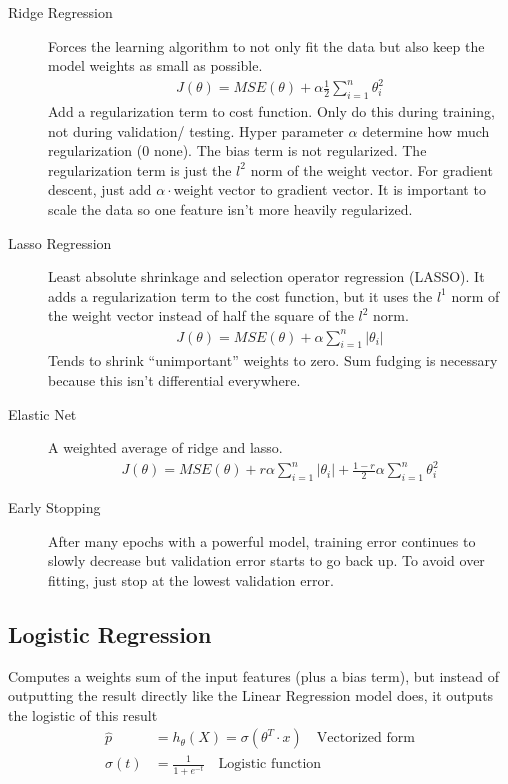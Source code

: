 \documentclass[10pt]{article}
\begin{document}
  \begin{description}
    \item[Ridge Regression] Forces the learning algorithm to not only fit the
      data but also keep the model weights as small as possible.
      \begin{align}
        J(\theta)=MSE(\theta)+\alpha\frac{1}{2}\sum_{i=1}^{n}\theta_i^2
      \end{align}
      Add a regularization term to cost function. Only do this during training,
      not during validation/ testing. Hyper parameter $\alpha$ determine how much
      regularization ($0$ none). The bias term is not regularized. The
      regularization term is just the $l^2$ norm of the weight vector. For
      gradient descent, just add $\alpha \cdot$weight vector to gradient vector.
      It is important to scale the data so one feature isn't more heavily
      regularized.
    \item[Lasso Regression] Least absolute shrinkage and selection operator
      regression (LASSO). It adds a regularization term to the cost function, but
      it uses the $l^1$ norm of the weight vector instead of half the square of
      the $l^2$ norm.
      \begin{align}
        J(\theta)=MSE(\theta)+\alpha\sum_{i=1}^{n}|\theta_i|
      \end{align}
      Tends to shrink ``unimportant'' weights to zero. Sum fudging is necessary
      because this isn't differential everywhere.
    \item[Elastic Net] A weighted average of ridge and lasso.
      \begin{align}
        J(\theta)=MSE(\theta)+r\alpha\sum_{i=1}^{n}|\theta_i|+\frac{1-r}{2}\alpha\sum_{i=1}^{n}\theta_i^2
      \end{align}
    \item[Early Stopping] After many epochs with a powerful model, training error
      continues to slowly decrease but validation error starts to go back up. To
      avoid over fitting, just stop at the lowest validation error.
  \end{description}

  \subsection{Logistic Regression}%
  \label{sub:logistic_regression}

  Computes a weights sum of the input features (plus a bias term), but instead
  of outputting the result directly like the Linear Regression model does, it
  outputs the logistic of this result
  \begin{align}
    \hat{p}&=h_\theta(X)=\sigma\left(\theta^T\cdot x\right)\quad\text{Vectorized
    form}\\
    \sigma(t)&=\frac{1}{1+e^{-t}}\quad\text{Logistic function}
  \end{align}
\end{document}
